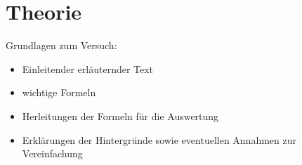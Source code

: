 \section{Theorie}
\label{sec:Theorie}

Grundlagen zum Versuch: 
\begin{itemize}
    \item Einleitender erläuternder Text
    \item wichtige Formeln
    \item Herleitungen der Formeln für die Auswertung
    \item Erklärungen der Hintergründe sowie eventuellen Annahmen zur Vereinfachung
\end{itemize}

